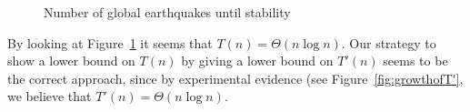 \documentclass[runningheads,a4paper]{llncs}
\begin{document}
\begin{figure}[!ht]
\centering
{} \qquad
{}
\caption{Number of global earthquakes until stability}
\label{fig:growthofT}
\end{figure}
By looking at Figure~\ref{fig:growthofT} it seems that $T(n) = \Theta(n\log n)$. Our strategy to show a lower bound on $T(n)$ by giving a lower bound on $T'(n)$ seems to be the correct approach, since by experimental evidence (see Figure~\ref{fig:growthofT'}, we believe that $T'(n) = \Theta(n\log n)$.
\end{document}
